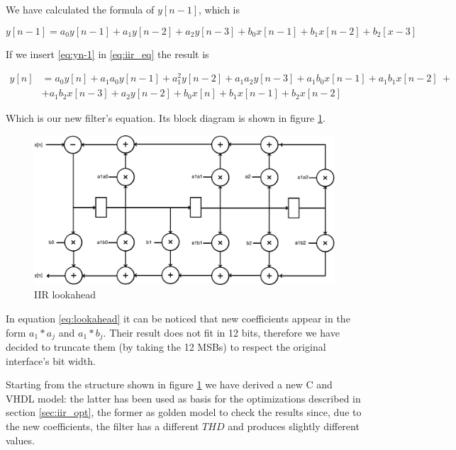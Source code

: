We have calculated the formula of $y[n-1]$, which is

\begin{equation}
    \label{eq:yn-1}
    y[n-1] = a_{0}y[n-1] + a_{1}y[n-2] + a_{2}y[n-3] + b_{0}x[n-1] + b_{1}x[n-2] + b_2[x-3]
\end{equation}

If we insert \ref{eq:yn-1} in \ref{eq:iir_eq} the result is

\begin{equation}
    \label{eq:lookahead}
    \begin{split}
        y[n] &= a_{0}y[n] + a_{1}a_{0}y[n-1] + a^2_{1}y[n-2] + a_{1}a_{2}y[n-3] + a_{1}b_{0}x[n-1] + a_{1}b_{1}x[n-2]\ + \\
    & + a_{1}b_{2}x[n-3] + a_{2}y[n-2] + b_{0}x[n] + b_{1}x[n-1] + b_{2}x[n-2]
    \end{split}
\end{equation}

Which is our new filter's equation. Its block diagram is shown in figure \ref{fig:iir_lookahead}.

\begin{figure}[!ht]
	\centering
	\includegraphics[width=0.7\linewidth]{./chapters/pictures/iir_lookahead.pdf}
	\caption{IIR lookahead}
	\label{fig:iir_lookahead}
\end{figure}

In equation \ref{eq:lookahead} it can be noticed that new coefficients appear in the form $a_{1}*a_{j}$ and $a_{1}*b_{j}$.
Their result does not fit in 12 bits, therefore we have decided to truncate them (by taking the 12 MSBs) to respect the original interface's bit width.

Starting from the structure shown in figure \ref{fig:iir_lookahead} we have derived a new C and VHDL model: the latter has been used as basis for the
optimizations described in section \ref{sec:iir_opt}, the former as golden model to check the results since, due to the new coefficients, the filter
has a different $THD$ and produces slightly different values. 

